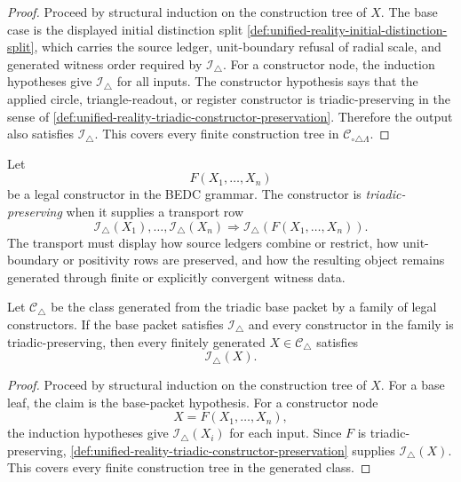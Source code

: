 \begin{proof}
Proceed by structural induction on the construction tree of $X$. The
base case is the displayed initial distinction split
\autoref{def:unified-reality-initial-distinction-split}, which carries
the source ledger, unit-boundary refusal of radial scale, and generated
witness order required by $\mathcal I_{\triangle}$. For a constructor
node, the induction hypotheses give $\mathcal I_{\triangle}$ for all
inputs. The constructor hypothesis says that the applied circle,
triangle-readout, or register constructor is triadic-preserving in the
sense of \autoref{def:unified-reality-triadic-constructor-preservation}.
Therefore the output also satisfies $\mathcal I_{\triangle}$. This
covers every finite construction tree in
$\mathcal C_{\circ\triangle\Lambda}$.
\end{proof}

\begin{definition}
\label{def:unified-reality-triadic-constructor-preservation}
Let
$$
F(X_1,\ldots,X_n)
$$
be a legal constructor in the BEDC grammar. The constructor is
\emph{triadic-preserving} when it supplies a transport row
$$
\mathcal I_{\triangle}(X_1),\ldots,
\mathcal I_{\triangle}(X_n)
\Longrightarrow
\mathcal I_{\triangle}(F(X_1,\ldots,X_n)).
$$
The transport must display how source ledgers combine or restrict, how
unit-boundary or positivity rows are preserved, and how the resulting
object remains generated through finite or explicitly convergent witness
data.
\end{definition}

\begin{theorem}
\label{thm:unified-reality-triadic-structural-induction}
Let $\mathcal C_{\triangle}$ be the class generated from the triadic base
packet by a family of legal constructors. If the base packet satisfies
$\mathcal I_{\triangle}$ and every constructor in the family is
triadic-preserving, then every finitely generated
$X\in\mathcal C_{\triangle}$ satisfies
$$
\mathcal I_{\triangle}(X).
$$
\end{theorem}

\begin{proof}
Proceed by structural induction on the construction tree of $X$. For a
base leaf, the claim is the base-packet hypothesis. For a constructor
node
$$
X=F(X_1,\ldots,X_n),
$$
the induction hypotheses give $\mathcal I_{\triangle}(X_i)$ for each
input. Since $F$ is triadic-preserving,
\autoref{def:unified-reality-triadic-constructor-preservation} supplies
$\mathcal I_{\triangle}(X)$. This covers every finite construction tree
in the generated class.
\end{proof}

